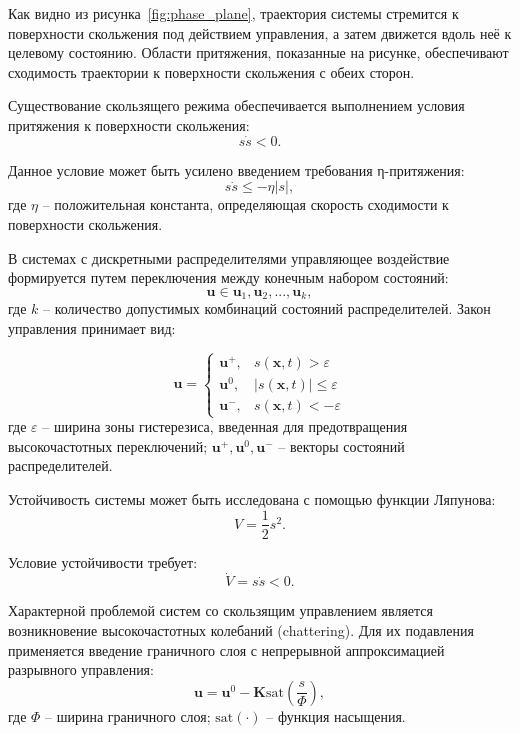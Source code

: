 Как видно из рисунка~\ref{fig:phase_plane}, траектория системы стремится к поверхности скольжения под действием управления,
а затем движется вдоль неё к целевому состоянию. Области притяжения, показанные на рисунке,
обеспечивают сходимость траектории к поверхности скольжения с обеих сторон.

Существование скользящего режима обеспечивается выполнением условия притяжения к поверхности скольжения:
\begin{equation*}
	s\dot{s} < 0.
\end{equation*}

Данное условие может быть усилено введением требования η-притяжения:
\begin{equation*}
	s\dot{s} \leq -\eta|s|,
\end{equation*}
где $\eta$ -- положительная константа, определяющая скорость сходимости к поверхности скольжения.

В системах с дискретными распределителями управляющее воздействие формируется путем переключения между конечным набором состояний:
\begin{equation*}
	\mathbf{u} \in {\mathbf{u}_1, \mathbf{u}_2, ..., \mathbf{u}_k},
\end{equation*}
где $k$ -- количество допустимых комбинаций состояний распределителей. Закон управления принимает вид:

\begin{equation*}
	\mathbf{u} = \begin{cases}
		\mathbf{u}^+, & s(\mathbf{x}, t) > \varepsilon      \\
		\mathbf{u}^0, & |s(\mathbf{x}, t)| \leq \varepsilon \\
		\mathbf{u}^-, & s(\mathbf{x}, t) < -\varepsilon
	\end{cases}
\end{equation*}
где $\varepsilon$ -- ширина зоны гистерезиса, введенная для предотвращения высокочастотных переключений;
$\mathbf{u}^+, \mathbf{u}^0, \mathbf{u}^-$ -- векторы состояний распределителей.

Устойчивость системы может быть исследована с помощью функции Ляпунова:
\begin{equation*}
	V = \frac{1}{2}s^2.
\end{equation*}

Условие устойчивости требует:
\begin{equation*}
	\dot{V} = s\dot{s} < 0.
\end{equation*}

Характерной проблемой систем со скользящим управлением является возникновение высокочастотных колебаний
(chattering). Для их подавления применяется введение граничного слоя с непрерывной аппроксимацией разрывного управления:
\begin{equation*}
	\mathbf{u} = \mathbf{u}^0 - \mathbf{K}\text{sat}\left(\frac{s}{\Phi}\right),
\end{equation*}
где $\Phi$ -- ширина граничного слоя; $\text{sat}(\cdot)$ -- функция насыщения.

